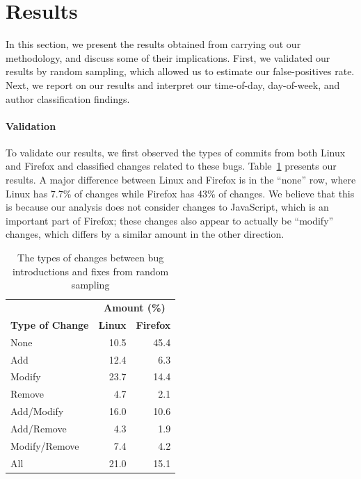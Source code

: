 \section{Results}
\label{sec-results}
In this section, we present the results obtained from carrying out our
methodology, and discuss some of their implications. First, we validated
our results by random sampling, which allowed us to estimate our
false-positives rate. Next, we report on our results and interpret
our time-of-day, day-of-week, and author classification findings.

\paragraph{Validation} 
To validate our results, we first observed the types of commits from both Linux
and Firefox and classified changes related to these bugs.
Table~\ref{tbl-changes} presents our results. A major difference
between Linux and Firefox is in the ``none'' row, where Linux has
7.7\% of changes while Firefox has 43\% of changes. We believe that
this is because our analysis does not consider changes to JavaScript,
which is an important part of Firefox; these changes also appear to
actually be ``modify'' changes, which differs by a similar amount
in the other direction.


\begin{table}
\begin{center}
\begin{tabular}{l|r|r}
\multicolumn{1}{c}{} & \multicolumn{2}{c}{\textbf{Amount (\%)}} \\
\textbf{Type of Change} & \multicolumn{1}{c|}{\textbf{Linux}} & \multicolumn{1}{c}{\textbf{Firefox}}\\
\hline
None          & 10.5 & 45.4\\
\hline
Add           & 12.4 &  6.3\\
\hline
Modify        & 23.7 & 14.4\\
\hline
Remove        &  4.7 &  2.1\\
\hline
Add/Modify    & 16.0 & 10.6\\
\hline
Add/Remove    &  4.3 &  1.9\\
\hline
Modify/Remove &  7.4 &  4.2\\
\hline
All           & 21.0 & 15.1\\
\end{tabular}
\end{center}
\caption{The types of changes between bug introductions and fixes from random sampling}
\label{tbl-changes}
\end{table}

